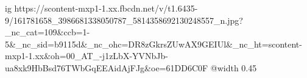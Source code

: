  
 
 
 
 

\ifcmt
  ig https://scontent-mxp1-1.xx.fbcdn.net/v/t1.6435-9/161781658_3986681338050787_5814358692130248557_n.jpg?_nc_cat=109&ccb=1-5&_nc_sid=b9115d&_nc_ohc=DR8zGkrsZUwAX9GEIUl&_nc_ht=scontent-mxp1-1.xx&oh=00_AT_-j1zLbX-YVNbJb-ua8xk9HbBsd76TWbGqEEAidAjFJg&oe=61DD6C0F
  @width 0.45
\fi
